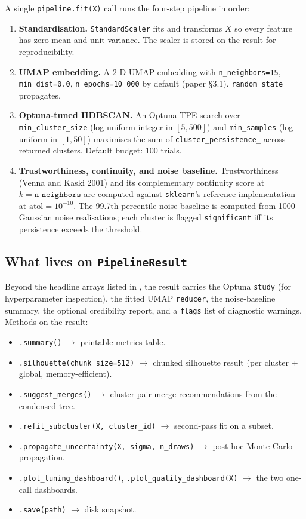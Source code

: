 \documentclass[11pt,a4paper]{article}
\begin{document}
A single \texttt{pipeline.fit(X)} call runs the four-step pipeline in order:

\begin{enumerate}[leftmargin=*]
  \item \textbf{Standardisation.} \texttt{StandardScaler} fits and transforms \(X\) so every feature has zero mean and unit variance. The scaler is stored on the result for reproducibility.
  \item \textbf{UMAP embedding.} A 2-D UMAP embedding with \texttt{n\_neighbors=15}, \texttt{min\_dist=0.0}, \texttt{n\_epochs=10\,000} by default (paper §3.1). \texttt{random\_state} propagates.
  \item \textbf{Optuna-tuned HDBSCAN.} An Optuna TPE search over \texttt{min\_cluster\_size} (log-uniform integer in \([5, 500]\)) and \texttt{min\_samples} (log-uniform in \([1, 50]\)) maximises the sum of \texttt{cluster\_persistence\_} across returned clusters. Default budget: 100 trials.
  \item \textbf{Trustworthiness, continuity, and noise baseline.} Trustworthiness (Venna and Kaski 2001) and its complementary continuity score at \(k = \texttt{n\_neighbors}\) are computed against \texttt{sklearn}'s reference implementation at \(\mathrm{atol} = 10^{-10}\). The 99.7th-percentile noise baseline is computed from \num{1000} Gaussian noise realisations; each cluster is flagged \texttt{significant} iff its persistence exceeds the threshold.
\end{enumerate}

\subsection{What lives on \texttt{PipelineResult}}

Beyond the headline arrays listed in , the result carries the Optuna \texttt{study} (for hyperparameter inspection), the fitted UMAP \texttt{reducer}, the noise-baseline summary, the optional credibility report, and a \texttt{flags} list of diagnostic warnings. Methods on the result:

\begin{itemize}[leftmargin=*,nosep]
  \item \texttt{.summary()} \(\rightarrow\) printable metrics table.
  \item \texttt{.silhouette(chunk\_size=512)} \(\rightarrow\) chunked silhouette result (per cluster + global, memory-efficient).
  \item \texttt{.suggest\_merges()} \(\rightarrow\) cluster-pair merge recommendations from the condensed tree.
  \item \texttt{.refit\_subcluster(X, cluster\_id)} \(\rightarrow\) second-pass fit on a subset.
  \item \texttt{.propagate\_uncertainty(X, sigma, n\_draws)} \(\rightarrow\) post-hoc Monte Carlo propagation.
  \item \texttt{.plot\_tuning\_dashboard()}, \texttt{.plot\_quality\_dashboard(X)} \(\rightarrow\) the two one-call dashboards.
  \item \texttt{.save(path)} \(\rightarrow\) disk snapshot.
\end{itemize}
\end{document}
